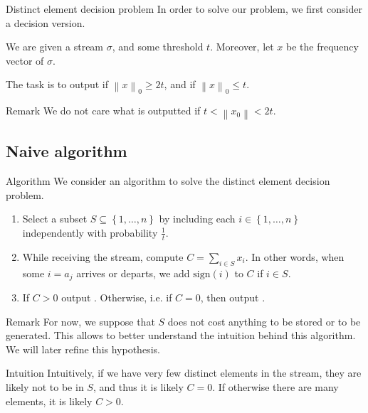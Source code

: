 \documentclass[a4paper]{article}
\begin{document}
\begin{parag}{Distinct element decision problem}
    In order to solve our problem, we first consider a decision version.

    We are given a stream $\sigma$, and some threshold $t$. Moreover, let $x$ be the frequency vector of $\sigma$.

    The task is to output  if $\left\|x\right\|_0 \geq 2t$, and  if $\left\|x\right\|_0 \leq t$.

    \begin{subparag}{Remark}
        We do not care what is outputted if $t < \left\|x_0\right\| < 2t$.
    \end{subparag}
\end{parag}

\subsection{Naive algorithm}
\begin{parag}{Algorithm}
    We consider an algorithm to solve the distinct element decision problem.
    \begin{enumerate}[left=0pt]
        \item Select a subset $S \subseteq \left\{1, \ldots, n\right\}$ by including each $i \in \left\{1, \ldots, n\right\}$ independently with probability $\frac{1}{t}$.
        \item While receiving the stream, compute $C = \sum_{i \in S} x_i$. In other words, when some $i = a_j$ arrives or departs, we add $\text{sign}\left(i\right)$ to $C$ if $i \in S$.
        \item If $C > 0$ output . Otherwise, i.e. if $C = 0$, then output .
    \end{enumerate}

    \begin{subparag}{Remark}
        For now, we suppose that $S$ does not cost anything to be stored or to be generated. This allows to better understand the intuition behind this algorithm. We will later refine this hypothesis.
    \end{subparag}
    
    \begin{subparag}{Intuition}
        Intuitively, if we have very few distinct elements in the stream, they are likely not to be in $S$, and thus it is likely $C = 0$. If otherwise there are many elements, it is likely $C > 0$.
    \end{subparag}
\end{parag}
\end{document}
